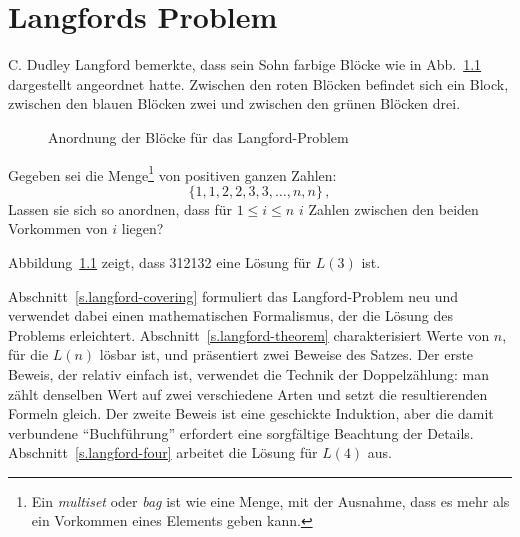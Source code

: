 
\chapter{Langfords Problem}\label{c.langford}


C. Dudley Langford bemerkte, dass sein Sohn farbige Blöcke wie in Abb.~\ref{f.langford} dargestellt angeordnet hatte.
Zwischen den roten Blöcken befindet sich ein Block, zwischen den blauen Blöcken zwei und zwischen den grünen Blöcken drei. 
\begin{figure}[ht]
\begin{center}
\end{center}
\caption{Anordnung der Blöcke für das Langford-Problem}\label{f.langford}
\end{figure}

\begin{definition} Gegeben sei die Menge\footnote{Ein \emph{multiset} oder \emph{bag} ist wie eine Menge, mit der Ausnahme, dass es mehr als ein Vorkommen eines Elements geben kann.} von positiven ganzen Zahlen:
\[
\{1,1,2,2,3,3,\ldots,n,n\}\,,
\]
Lassen sie sich so anordnen, dass für $1\leq i \leq n$ $i$ Zahlen zwischen den beiden Vorkommen von $i$ liegen?
\end{definition}

Abbildung~\ref{f.langford} zeigt, dass 312132 eine Lösung für $L(3)$ ist.

\smallskip

Abschnitt~\ref{s.langford-covering} formuliert das Langford-Problem neu und verwendet dabei einen mathematischen Formalismus, der die Lösung des Problems erleichtert. Abschnitt~\ref{s.langford-theorem} charakterisiert Werte von $n$, für die $L(n)$ lösbar ist, und präsentiert zwei Beweise des Satzes. Der erste Beweis, der relativ einfach ist, verwendet die Technik der Doppelzählung: man zählt denselben Wert auf zwei verschiedene Arten und setzt die resultierenden Formeln gleich. Der zweite Beweis ist eine geschickte Induktion, aber die damit verbundene ``Buchführung'' erfordert eine sorgfältige Beachtung der Details. Abschnitt~\ref{s.langford-four} arbeitet die Lösung für $L(4)$ aus.

